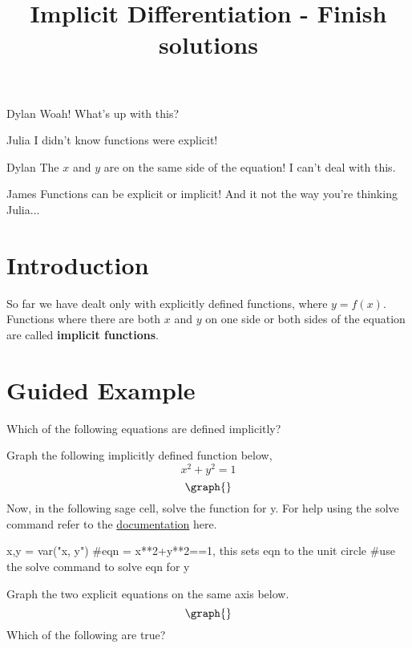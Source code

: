 \documentclass{ximera}
\title{Implicit Differentiation - Finish solutions}
\begin{document}
\maketitle
\begin{dialogue}
\item[Dylan] Woah! What's up with this?
\item[Julia] I didn't know functions were explicit!
\item[Dylan] The $x$ and $y$ are on the same side of the equation! I can't deal with this.
\item[James] Functions can be explicit or implicit! And it not the way you're thinking Julia...
\end{dialogue}
\section{Introduction}
So far we have dealt only with explicitly defined functions, where $y=f(x)$.  Functions where there are both $x$ and $y$ on one side or both sides of the equation are called \textbf{implicit functions}.
\section{Guided Example}
\begin{question}
Which of the following equations are defined implicitly?
\begin{selectAll}
\end{selectAll}
\end{question}
\begin{question}
Graph the following implicitly defined function below, $$x^2+y^2=1$$
\[
\graph{}
\]
Now, in the following sage cell, solve the function for y. For help using the solve command refer to the \href{http://doc.sagemath.org/html/en/tutorial/tour_algebra.html#solving-equations}{documentation} here.
\begin{onlineOnly}
\begin{sageCell}
x,y = var("x, y")
#eqn = x**2+y**2==1, this sets eqn to the unit circle
#use the solve command to solve eqn for y
\end{sageCell}
\end{onlineOnly}
Graph the two explicit equations on the same axis below.
\[
\graph{}
\]
Which of the following are true?
\begin{selectAll}
\end{selectAll}

\end{question}
\end{document}

